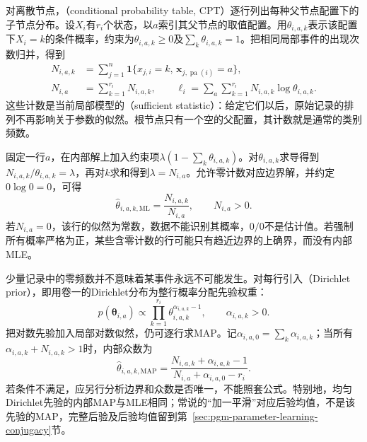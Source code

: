 对离散节点，（conditional probability table, CPT）逐行列出每种父节点配置下的子节点分布。设$X_i$有$r_i$个状态，以$a$索引其父节点的取值配置。用$\theta_{i,a,k}$表示该配置下$X_i=k$的条件概率，约束为$\theta_{i,a,k}\geq0$及$\sum_k\theta_{i,a,k}=1$。把相同局部事件的出现次数归并，得到
\begin{equation}
  \begin{aligned}
    N_{i,a,k}
      &=\sum_{j=1}^n
        \mathbf{1}\{x_{j,i}=k,\,
          \bm{x}_{j,\operatorname{pa}(i)}=a\},\\
    N_{i,a}&=\sum_{k=1}^{r_i}N_{i,a,k},\qquad
    \ell_i=\sum_a\sum_{k=1}^{r_i}
      N_{i,a,k}\log\theta_{i,a,k}.
  \end{aligned}
  \label{eq:pgm-parameter-learning-counts}
\end{equation}
这些计数是当前局部模型的（sufficient statistic）：给定它们以后，原始记录的排列不再影响关于参数的似然。根节点只有一个空的父配置，其计数就是通常的类别频数。

固定一行$a$，在内部解上加入约束项$\lambda(1-\sum_k\theta_{i,a,k})$。对$\theta_{i,a,k}$求导得到$N_{i,a,k}/\theta_{i,a,k}=\lambda$，再对$k$求和得到$\lambda=N_{i,a}$。允许零计数对应边界解，并约定$0\log0=0$，可得
\begin{equation}
  \widehat{\theta}_{i,a,k,\mathrm{ML}}
    =\frac{N_{i,a,k}}{N_{i,a}},\qquad N_{i,a}>0.
  \label{eq:pgm-parameter-learning-cpt-mle}
\end{equation}
若$N_{i,a}=0$，该行的似然为常数，数据不能识别其概率，$0/0$不是估计值。若强制所有概率严格为正，某些含零计数的行可能只有趋近边界的上确界，而没有内部MLE。

少量记录中的零频数并不意味着某事件永远不可能发生。对每行引入（Dirichlet prior），即用卷一的Dirichlet分布为整行概率分配先验权重：
\[
  p(\bm{\theta}_{i,a})
  \propto\prod_{k=1}^{r_i}
    \theta_{i,a,k}^{\alpha_{i,a,k}-1},
  \qquad \alpha_{i,a,k}>0.
\]
把对数先验加入局部对数似然，仍可逐行求MAP。记$\alpha_{i,a,0}=\sum_k\alpha_{i,a,k}$；当所有$\alpha_{i,a,k}+N_{i,a,k}>1$时，内部众数为
\begin{equation}
  \widehat{\theta}_{i,a,k,\mathrm{MAP}}
    =\frac{N_{i,a,k}+\alpha_{i,a,k}-1}
            {N_{i,a}+\alpha_{i,a,0}-r_i}.
  \label{eq:pgm-parameter-learning-cpt-map}
\end{equation}
若条件不满足，应另行分析边界和众数是否唯一，不能照套公式。特别地，均匀Dirichlet先验的内部MAP与MLE相同；常说的“加一平滑”对应后验均值，不是该先验的MAP，完整后验及后验均值留到第~\ref{sec:pgm-parameter-learning-conjugacy}节。

